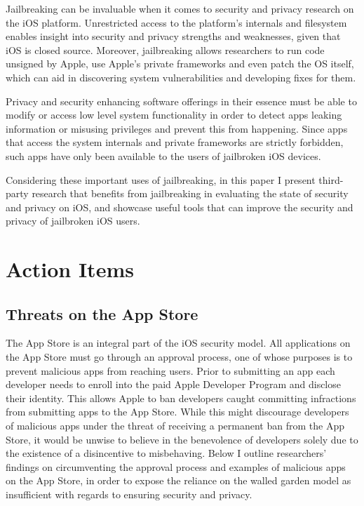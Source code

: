 \documentclass[12pt, titlepage, oneside]{amsart}
\begin{document}
Jailbreaking can be invaluable when it comes to security and privacy research on the iOS platform. Unrestricted access to the platform's internals and filesystem enables insight into security and privacy strengths and weaknesses, given that iOS is closed source. Moreover, jailbreaking allows researchers to run code unsigned by Apple, use Apple's private frameworks and even patch the OS itself, which can aid in discovering system vulnerabilities and developing fixes for them. 

Privacy and security enhancing software offerings in their essence must be able to modify or access low level system functionality in order to detect apps leaking information or misusing privileges and prevent this from happening. Since apps that access the system internals and private frameworks are strictly forbidden, such apps have only been available to the users of jailbroken iOS devices. 

Considering these important uses of jailbreaking, in this paper I present third-party research that benefits from jailbreaking in evaluating the state of security and privacy on iOS, and showcase useful tools that can improve the security and privacy of jailbroken iOS users.
\section{Action Items}

\subsection{Threats on the App Store}

The App Store is an integral part of the iOS security model. All applications on the App Store must go through an approval process, one of whose purposes is to prevent malicious apps from reaching users. Prior to submitting an app each developer needs to enroll into the paid Apple Developer Program and disclose their identity. This allows Apple to ban developers caught committing infractions from submitting apps to the App Store. While this might discourage developers of malicious apps under the threat of receiving a permanent ban from the App Store, it would be unwise to believe in the benevolence of developers solely due to the existence of a disincentive to misbehaving. Below I outline researchers' findings on circumventing the approval process and examples of malicious apps on the App Store, in order to expose the reliance on the walled garden model as insufficient with regards to ensuring security and privacy. 
\end{document}
